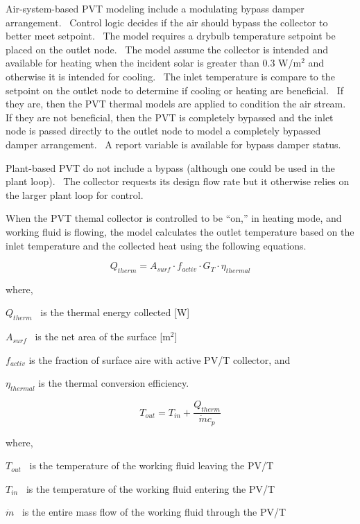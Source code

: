 Air-system-based PVT modeling include a modulating bypass damper arrangement.~ Control logic decides if the air should bypass the collector to better meet setpoint.~ The model requires a drybulb temperature setpoint be placed on the outlet node.~ The model assume the collector is intended and available for heating when the incident solar is greater than 0.3 W/m\(^{2}\) and otherwise it is intended for cooling.~ The inlet temperature is compare to the setpoint on the outlet node to determine if cooling or heating are beneficial.~ If they are, then the PVT thermal models are applied to condition the air stream.~ If they are not beneficial, then the PVT is completely bypassed and the inlet node is passed directly to the outlet node to model a completely bypassed damper arrangement.~ A report variable is available for bypass damper status.

Plant-based PVT do not include a bypass (although one could be used in the plant loop).~ The collector requests its design flow rate but it otherwise relies on the larger plant loop for control.

When the PVT themal collector is controlled to be ``on,'' in heating mode, and working fluid is flowing, the model calculates the outlet temperature based on the inlet temperature and the collected heat using the following equations.

\begin{equation}
{Q_{therm}} = {A_{surf}} \cdot {f_{activ}} \cdot {G_T} \cdot {\eta_{thermal}}
\end{equation}

where,

\({Q_{therm}}\) ~is the thermal energy collected {[}W{]}

\({A_{surf}}\) ~is the net area of the surface {[}m\(^{2}\){]}

\({f_{activ}}\) is the fraction of surface aire with active PV/T collector, and

\({\eta_{thermal}}\) is the thermal conversion efficiency.

\begin{equation}
{T_{out}} = {T_{in}} + \frac{{{Q_{therm}}}}{{\dot m{c_p}}}
\end{equation}

where,

\({T_{out}}\) ~is the temperature of the working fluid leaving the PV/T

\({T_{in}}\) ~is the temperature of the working fluid entering the PV/T

\(\dot m\) ~is the entire mass flow of the working fluid through the PV/T

